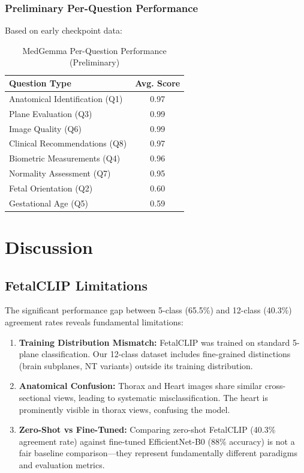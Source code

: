 \documentclass[11pt,a4paper]{article}
\begin{document}
\subsubsection{Preliminary Per-Question Performance}

Based on early checkpoint data:

\begin{table}[H]
\centering
\caption{MedGemma Per-Question Performance (Preliminary)}
\begin{tabular}{lc}
\toprule
\textbf{Question Type} & \textbf{Avg. Score} \\
\midrule
Anatomical Identification (Q1) & 0.97 \\
Plane Evaluation (Q3) & 0.99 \\
Image Quality (Q6) & 0.99 \\
Clinical Recommendations (Q8) & 0.97 \\
Biometric Measurements (Q4) & 0.96 \\
Normality Assessment (Q7) & 0.95 \\
Fetal Orientation (Q2) & 0.60 \\
Gestational Age (Q5) & 0.59 \\
\bottomrule
\end{tabular}
\end{table}

\section{Discussion}

\subsection{FetalCLIP Limitations}

The significant performance gap between 5-class (65.5\%) and 12-class (40.3\%) agreement rates reveals fundamental limitations:

\begin{enumerate}
    \item \textbf{Training Distribution Mismatch:} FetalCLIP was trained on standard 5-plane classification. Our 12-class dataset includes fine-grained distinctions (brain subplanes, NT variants) outside its training distribution.

    \item \textbf{Anatomical Confusion:} Thorax and Heart images share similar cross-sectional views, leading to systematic misclassification. The heart is prominently visible in thorax views, confusing the model.

    \item \textbf{Zero-Shot vs Fine-Tuned:} Comparing zero-shot FetalCLIP (40.3\% agreement rate) against fine-tuned EfficientNet-B0 (88\% accuracy) is not a fair baseline comparison---they represent fundamentally different paradigms and evaluation metrics.
\end{enumerate}
\end{document}

